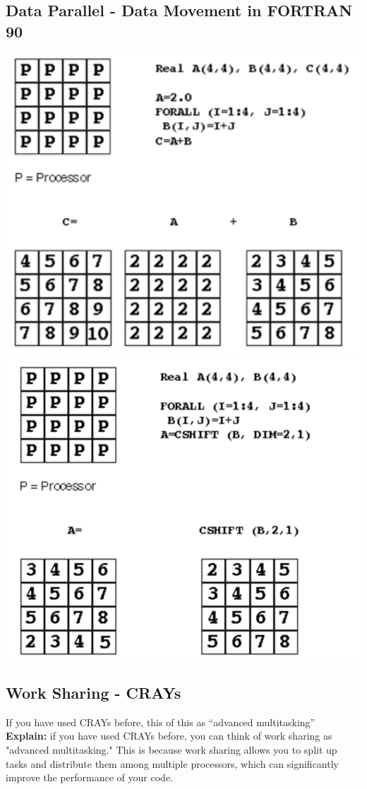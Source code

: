 \documentclass[12pt, a4paper]{book}
\begin{document}
\subsection{Data Parallel - Data Movement in FORTRAN 90}
\includegraphics[width=0.5\linewidth]{figures/Data Movement in FORTRAN 90-01.png}
\includegraphics[width=0.5\linewidth]{figures/Data Movement in FORTRAN 90-02.png}

\subsection{Work Sharing - CRAYs}
If you have used CRAYs before, this of this as “advanced multitasking”\\
\textbf{Explain:} if you have used CRAYs before, you can think of work sharing as "advanced multitasking." This is because work sharing allows you to split up tasks and distribute them among multiple processors, which can significantly improve the performance of your code.
\end{document}
